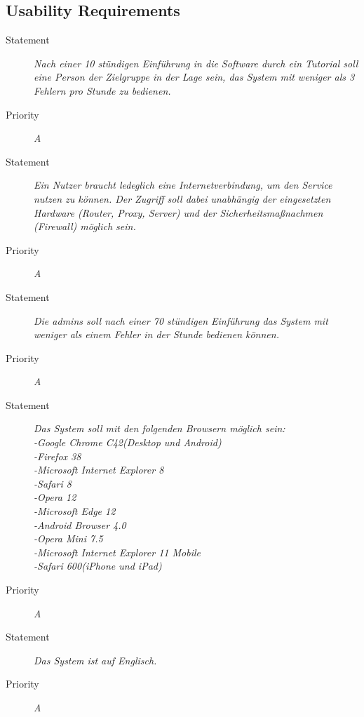 \subsection{Usability Requirements}

\NFR
\begin{description}
\item[Statement] \textit{Nach einer 10 stündigen Einführung in die Software durch ein Tutorial soll eine Person der Zielgruppe in der Lage sein, das System mit weniger als 3 Fehlern pro Stunde zu bedienen.}
\item[Priority] \textit{A}
\end{description}

\NFR
\begin{description}
\item[Statement] \textit{Ein Nutzer braucht ledeglich eine Internetverbindung, um den Service nutzen zu können. Der Zugriff soll dabei unabhängig der eingesetzten Hardware (Router, Proxy, Server) und der Sicherheitsmaßnachmen (Firewall) möglich sein.}
\item[Priority] \textit{A}
\end{description}

\NFR
\begin{description}
	\item[Statement] \textit{Die \glspl{admin} soll nach einer 70 stündigen Einführung das System mit weniger als einem Fehler in der Stunde bedienen können.}
	\item[Priority] \textit{A}
\end{description}
\NFR
\begin{description}
\item[Statement] \textit{Das System soll mit den folgenden Browsern möglich sein:\\
	-Google Chrome C42(Desktop und Android)\\
	-Firefox 38\\
	-Microsoft Internet Explorer 8\\
	-Safari 8\\
	-Opera 12\\
	-Microsoft Edge 12\\
	-Android Browser 4.0\\
	-Opera Mini 7.5\\
	-Microsoft Internet Explorer 11 Mobile\\
	-Safari 600(iPhone und iPad)}
\item[Priority] \textit{A}
\end{description}

\NFR
\begin{description}
\item[Statement] \textit{Das System ist auf Englisch.}
\item[Priority] \textit{A}
\end{description}